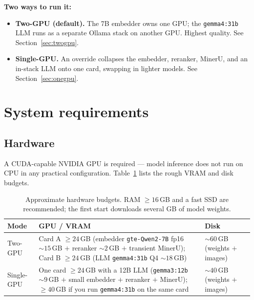 \documentclass[11pt,a4paper]{article}
\newcommand{\code}[1]{\texttt{\small #1}}
\begin{document}
\noindent\textbf{Two ways to run it:}
\begin{itemize}[leftmargin=1.4em,itemsep=2pt]
  \item \textbf{Two-GPU (default).} The 7B embedder owns one GPU; the
        \code{gemma4:31b} LLM runs as a separate Ollama stack on another GPU.
        Highest quality. See Section~\ref{sec:twogpu}.
  \item \textbf{Single-GPU.} An override collapses the embedder, reranker,
        MinerU, and an in-stack LLM onto one card, swapping in lighter models.
        See Section~\ref{sec:onegpu}.
\end{itemize}

\section{System requirements}\label{sec:req}

\subsection{Hardware}
A CUDA-capable NVIDIA GPU is required --- model inference does not run on CPU in
any practical configuration. Table~\ref{tab:hw} lists the rough VRAM and disk
budgets.

\begin{table}[H]
\centering\small
\renewcommand{\arraystretch}{1.25}
\begin{tabular}{>{\raggedright\arraybackslash}p{3.0cm}
                >{\raggedright\arraybackslash}p{6.2cm}
                >{\raggedright\arraybackslash}p{4.4cm}}
\toprule
\textbf{Mode} & \textbf{GPU / VRAM} & \textbf{Disk} \\
\midrule
Two-GPU &
  Card A $\ge 24$\,GB (embedder \code{gte-Qwen2-7B} fp16 ${\sim}15$\,GB $+$
  reranker ${\sim}2$\,GB $+$ transient MinerU); \newline
  Card B $\ge 24$\,GB (LLM \code{gemma4:31b} Q4 ${\sim}18$\,GB) &
  ${\sim}60$\,GB (weights $+$ images) \\
Single-GPU &
  One card $\ge 24$\,GB with a 12B LLM (\code{gemma3:12b} ${\sim}9$\,GB $+$
  small embedder $+$ reranker $+$ MinerU); \newline
  $\ge 40$\,GB if you run \code{gemma4:31b} on the same card &
  ${\sim}40$\,GB (weights $+$ images) \\
\bottomrule
\end{tabular}
\caption{Approximate hardware budgets. RAM $\ge 16$\,GB and a fast SSD are
recommended; the first start downloads several GB of model weights.}
\label{tab:hw}
\end{table}
\end{document}
